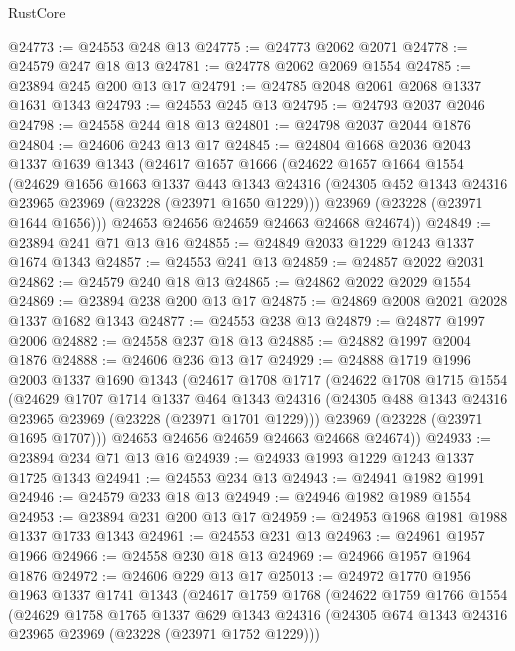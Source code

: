 \begin{lexlean}{RustCore}
\begin{coremodule}
@24773 := @24553 @248 @13
@24775 := @24773 @2062 @2071
@24778 := @24579 @247 @18 @13
@24781 := @24778 @2062 @2069 @1554
@24785 := @23894 @245 @200 @13 @17
@24791 := @24785 @2048 @2061 @2068 @1337 @1631 @1343
@24793 := @24553 @245 @13
@24795 := @24793 @2037 @2046
@24798 := @24558 @244 @18 @13
@24801 := @24798 @2037 @2044 @1876
@24804 := @24606 @243 @13 @17
@24845 := @24804
    @1668
    @2036
    @2043
    @1337
    @1639
    @1343
    (@24617
      @1657
      @1666
      (@24622
        @1657
        @1664
        @1554
        (@24629
          @1656
          @1663
          @1337
          @443
          @1343
          @24316
          (@24305 @452 @1343 @24316 @23965 @23969 (@23228 (@23971 @1650 @1229)))
          @23969
          (@23228 (@23971 @1644 @1656)))
        @24653
        @24656
        @24659
        @24663
        @24668
        @24674))
@24849 := @23894 @241 @71 @13 @16
@24855 := @24849 @2033 @1229 @1243 @1337 @1674 @1343
@24857 := @24553 @241 @13
@24859 := @24857 @2022 @2031
@24862 := @24579 @240 @18 @13
@24865 := @24862 @2022 @2029 @1554
@24869 := @23894 @238 @200 @13 @17
@24875 := @24869 @2008 @2021 @2028 @1337 @1682 @1343
@24877 := @24553 @238 @13
@24879 := @24877 @1997 @2006
@24882 := @24558 @237 @18 @13
@24885 := @24882 @1997 @2004 @1876
@24888 := @24606 @236 @13 @17
@24929 := @24888
    @1719
    @1996
    @2003
    @1337
    @1690
    @1343
    (@24617
      @1708
      @1717
      (@24622
        @1708
        @1715
        @1554
        (@24629
          @1707
          @1714
          @1337
          @464
          @1343
          @24316
          (@24305 @488 @1343 @24316 @23965 @23969 (@23228 (@23971 @1701 @1229)))
          @23969
          (@23228 (@23971 @1695 @1707)))
        @24653
        @24656
        @24659
        @24663
        @24668
        @24674))
@24933 := @23894 @234 @71 @13 @16
@24939 := @24933 @1993 @1229 @1243 @1337 @1725 @1343
@24941 := @24553 @234 @13
@24943 := @24941 @1982 @1991
@24946 := @24579 @233 @18 @13
@24949 := @24946 @1982 @1989 @1554
@24953 := @23894 @231 @200 @13 @17
@24959 := @24953 @1968 @1981 @1988 @1337 @1733 @1343
@24961 := @24553 @231 @13
@24963 := @24961 @1957 @1966
@24966 := @24558 @230 @18 @13
@24969 := @24966 @1957 @1964 @1876
@24972 := @24606 @229 @13 @17
@25013 := @24972
    @1770
    @1956
    @1963
    @1337
    @1741
    @1343
    (@24617
      @1759
      @1768
      (@24622
        @1759
        @1766
        @1554
        (@24629
          @1758
          @1765
          @1337
          @629
          @1343
          @24316
          (@24305 @674 @1343 @24316 @23965 @23969 (@23228 (@23971 @1752 @1229)))

\end{coremodule}
\end{lexlean}
